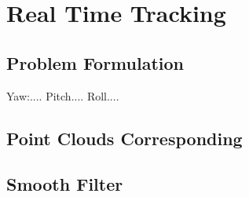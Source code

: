 \chapter{Real Time Tracking}
\label{c:tracking}

\section{Problem Formulation}
Yaw:....
Pitch....
Roll....


\section{Point Clouds Corresponding}

\section{Smooth Filter}